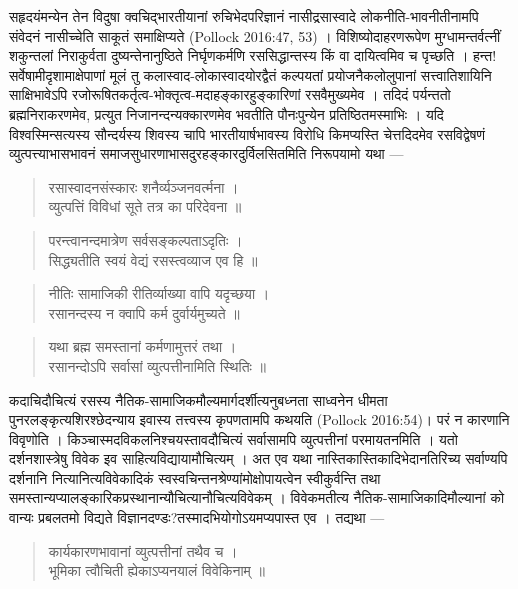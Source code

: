 {\dev सहृदयंमन्येन तेन विदुषा क्वचिद्भारतीयानां रुचिभेदपरिज्ञानं नासीद्रसास्वादे लोकनीति-भाव\-नीतीनामपि संवेदनं नासीच्चेति साकूतं समाक्षिप्यते} (Pollock 2016:47, 53) {\dev । विशिष्यो\-दाहरणरूपेण मुग्धामन्तर्वत्नीं शकुन्तलां निराकुर्वता दुष्यन्तेनानुष्ठिते निर्घृणकर्मणि रससि\-द्धान्तस्य किं वा दायित्वमिव च पृच्छति । हन्त! सर्वेषामीदृशामाक्षेपाणां मूलं तु कलास्वाद-लोकास्वादयोरद्वैतं कल्पयतां प्रयोजनैकलोलुपानां सत्त्वातिशायिनि साक्षिभावेऽपि रजोरू\-षितकर्तृत्व-भोक्तृत्व-मदाहङ्कारहुङ्कारिणां रसवैमुख्यमेव । तदिदं पर्यन्ततो ब्रह्मनिराकरणमेव, प्रत्युत निजानन्दन्यक्कारणमेव भवतीति पौनःपुन्येन प्रतिष्ठितमस्माभिः । यदि विश्वस्मिन्स\-त्यस्य सौन्दर्यस्य शिवस्य चापि भारतीयार्षभावस्य विरोधि किमप्यस्ति चेत्तदिदमेव रसविद्वेषणं व्युत्पत्त्याभासभावनं समाजसुधारणाभासदुरहङ्कारदुर्विलसितमिति निरूपयामो यथा ---}        
\begin{quote}
{\dev रसास्वादनसंस्कारः शनैर्व्यञ्जनवर्त्मना ।}\\
{\dev व्युत्पत्तिं विविधां सूते तत्र का परिदेवना ॥}
\end{quote}
\begin{quote}
{\dev परन्त्वानन्दमात्रेण सर्वसङ्कल्पताऽदृतिः ।}\\
{\dev सिद्ध्यतीति स्वयं वेद्यं रसस्त्वव्याज एव हि ॥}
\end{quote}
\begin{quote}
{\dev नीतिः सामाजिकी रीतिर्व्याख्या वापि यदृच्छया ।}\\
{\dev रसानन्दस्य न क्वापि कर्म दुर्वार्यमुच्यते ॥}
\end{quote}
\begin{quote}
{\dev यथा ब्रह्म समस्तानां कर्मणामुत्तरं तथा ।}\\
{\dev रसानन्दोऽपि सर्वासां व्युत्पत्तीनामिति स्थितिः ॥}
\end{quote}

{\dev कदाचिदौचित्यं रसस्य नैतिक-सामाजिकमौल्यमार्गदर्शीत्यनुबध्नता साध्वनेन धीमता पुन\-रलङ्कृत्यशिरश्छेदन्याय इवास्य तत्त्वस्य कृपणतामपि कथयति} (Pollock 2016:54){\dev । परं न कारणानि विवृणोति । किञ्चास्मदविकलनिश्चयस्तावदौचित्यं सर्वासामपि व्युत्पत्तीनां परमायत\-नमिति । यतो दर्शनशास्त्रेषु विवेक इव साहित्यविद्यायामौचित्यम् । अत एव यथा नास्ति\-कास्तिकादिभेदानतिरिच्य सर्वाण्यपि दर्शनानि नित्यानित्यविवेकादिकं स्वस्वचिन्तनश्रेण्यां\break मोक्षोपायत्वेन स्वीकुर्वन्ति तथा समस्तान्यप्यालङ्कारिकप्रस्थानान्यौचित्यानौचित्यविवेकम् । विवेकमतीत्य नैतिक-सामाजिकादिमौल्यानां को वान्यः प्रबलतमो विद्यते विज्ञानदण्डः?\break तस्मादभियोगोऽयमप्यपास्त एव । तद्यथा ---} 
\begin{quote}
{\dev कार्यकारणभावानां व्युत्पत्तीनां तथैव च ।}\\
{\dev भूमिका त्वौचिती ह्येकाऽप्यनयालं विवेकिनाम् ॥}
\end{quote}

